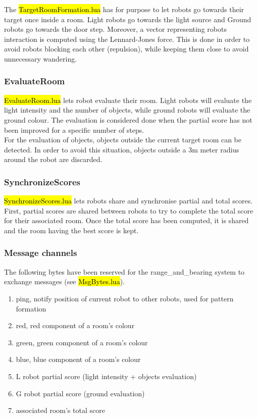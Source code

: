 The \hl{TargetRoomFormation.lua} has for purpose to let robots go towards their
target once inside a room. Light robots go towards the light source and Ground
robots go towards the door step. Moreover, a vector representing robots
interaction is computed using the Lennard-Jones force. This is done in order
to avoid robots blocking each other (repulsion), while keeping them close to
avoid unnecessary wandering.

\subsubsection{EvaluateRoom}

\hl{EvaluateRoom.lua} lets robot evaluate their room. Light robots will evaluate
the light intensity and the number of objects, while ground robots will evaluate
the ground colour. The evaluation is considered done when the partial score has
not been improved for a specific number of steps.\\

For the evaluation of objects, objects outside the current target room can be
detected. In order to avoid this situation, objects outside a 3m meter radius
around the robot are discarded.

\subsubsection{SynchronizeScores}

\hl{SynchronizeScores.lua} lets robots share and synchronise partial and total
scores. First, partial scores are shared between robots to try to complete
the total score for their associated room. Once the total score has been
computed, it is shared and the room having the best score is kept.

\subsubsection{Message channels}

The following bytes have been reserved for the range\_and\_bearing system to
exchange messages (see \hl{MsgBytes.lua}).

\begin{enumerate}
    \item ping, notify position of current robot to other robots, used for
    pattern formation
    \item red, red component of a room's colour
    \item green, green component of a room's colour
    \item blue, blue component of a room's colour
    \item L robot partial score (light intensity + objects evaluation)
    \item G robot partial score (ground evaluation)
    \item associated room's total score
\end{enumerate}

